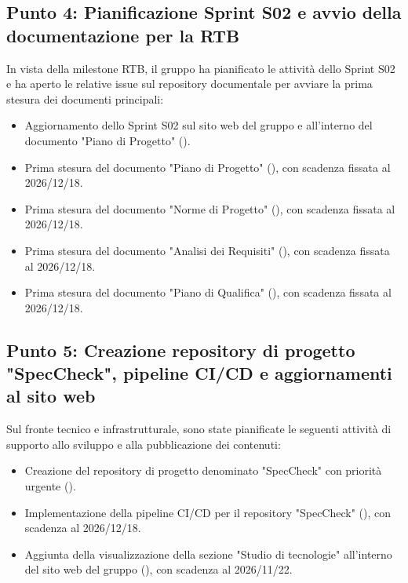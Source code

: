 \documentclass[a4paper, 11pt]{article}
\begin{document}
\subsection{Punto 4: Pianificazione Sprint S02 e avvio della documentazione per la RTB}
In vista della milestone RTB, il gruppo ha pianificato le attività dello Sprint S02 e ha aperto le relative issue sul repository documentale per avviare la prima stesura dei documenti principali:
\begin{itemize}
    \item Aggiornamento dello Sprint S02 sul sito web del gruppo e all'interno del documento "Piano di Progetto" ().\vspace{-0.2cm}
    \item Prima stesura del documento "Piano di Progetto" (), con scadenza fissata al 2026/12/18.\vspace{-0.2cm}
    \item Prima stesura del documento "Norme di Progetto" (), con scadenza fissata al 2026/12/18.\vspace{-0.2cm}
    \item Prima stesura del documento "Analisi dei Requisiti" (), con scadenza fissata al 2026/12/18.\vspace{-0.2cm}
    \item Prima stesura del documento "Piano di Qualifica" (), con scadenza fissata al 2026/12/18.
\end{itemize}

\subsection{Punto 5: Creazione repository di progetto "SpecCheck", pipeline CI/CD e aggiornamenti al sito web}
Sul fronte tecnico e infrastrutturale, sono state pianificate le seguenti attività di supporto allo sviluppo e alla pubblicazione dei contenuti:
\begin{itemize}
    \item Creazione del repository di progetto denominato "SpecCheck" con priorità urgente ().\vspace{-0.2cm}
    \item Implementazione della pipeline CI/CD per il repository "SpecCheck" (), con scadenza al 2026/12/18.\vspace{-0.2cm}
    \item Aggiunta della visualizzazione della sezione "Studio di tecnologie" all'interno del sito web del gruppo (), con scadenza al 2026/11/22.
\end{itemize}
\end{document}
